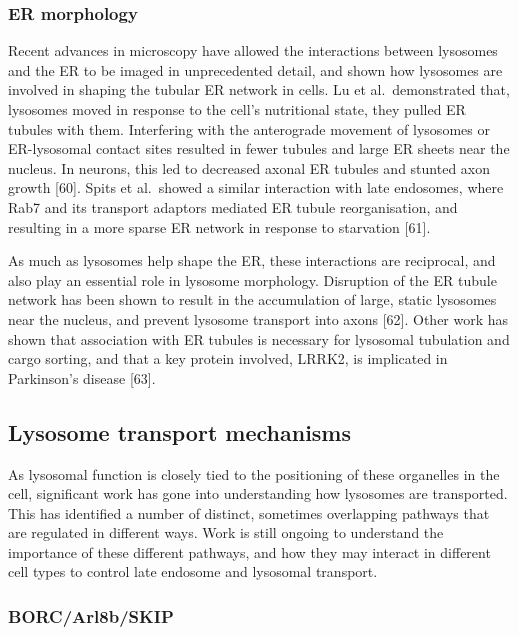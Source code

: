 \documentclass[
  12pt,
  a4paper,
]{book}
\begin{document}
\hypertarget{er-morphology}{%
\subsubsection{ER morphology}\label{er-morphology}}

Recent advances in microscopy have allowed the interactions between lysosomes and the ER to be imaged in unprecedented detail, and shown how lysosomes are involved in shaping the tubular ER network in cells. Lu et al.~demonstrated that, lysosomes moved in response to the cell's nutritional state, they pulled ER tubules with them. Interfering with the anterograde movement of lysosomes or ER-lysosomal contact sites resulted in fewer tubules and large ER sheets near the nucleus. In neurons, this led to decreased axonal ER tubules and stunted axon growth {[}60{]}. Spits et al.~showed a similar interaction with late endosomes, where Rab7 and its transport adaptors mediated ER tubule reorganisation, and resulting in a more sparse ER network in response to starvation {[}61{]}.

As much as lysosomes help shape the ER, these interactions are reciprocal, and also play an essential role in lysosome morphology. Disruption of the ER tubule network has been shown to result in the accumulation of large, static lysosomes near the nucleus, and prevent lysosome transport into axons {[}62{]}. Other work has shown that association with ER tubules is necessary for lysosomal tubulation and cargo sorting, and that a key protein involved, LRRK2, is implicated in Parkinson's disease {[}63{]}.

\hypertarget{lysosome-transport-mechanisms}{%
\subsection{Lysosome transport mechanisms}\label{lysosome-transport-mechanisms}}

As lysosomal function is closely tied to the positioning of these organelles in the cell, significant work has gone into understanding how lysosomes are transported. This has identified a number of distinct, sometimes overlapping pathways that are regulated in different ways. Work is still ongoing to understand the importance of these different pathways, and how they may interact in different cell types to control late endosome and lysosomal transport.

\hypertarget{borcarl8bskip}{%
\subsubsection{BORC/Arl8b/SKIP}\label{borcarl8bskip}}
\end{document}
